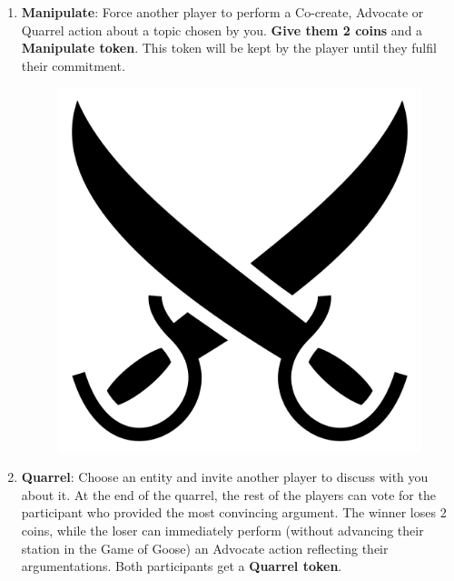 \documentclass{article}
\begin{document}
\begin{multicols}{2}
\begin{enumerate}
\item \textbf{Manipulate}: Force another player to perform a Co-create, Advocate or Quarrel action about a topic chosen by you. \textbf{Give them 2 coins} and a \textbf{Manipulate token}. This token will be kept by the player until they fulfil their commitment.

\vspace{1cm} 

\begin{figure}[H]
\centering
\includegraphics[scale=0.05]{figs/crossed-sabres_w.png}
\end{figure}
   
\item \textbf{Quarrel}: Choose an entity and invite another player to discuss with you about it. At the end of the quarrel, the rest of the players can vote for the participant who provided the most convincing argument. The winner loses 2 coins, while the loser can immediately perform (without advancing their station in the Game of Goose) an Advocate action reflecting their argumentations. Both participants get a \textbf{Quarrel token}.


\end{enumerate}
\end{multicols}
\end{document}
